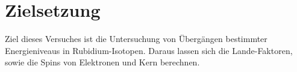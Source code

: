 \section{Zielsetzung}
\label{sec:zielsetzung}

Ziel dieses Versuches ist die Untersuchung von Übergängen bestimmter
Energieniveaus in Rubidium-Isotopen. Daraus lassen sich die Lande-Faktoren,
sowie die Spins von Elektronen und Kern berechnen.
